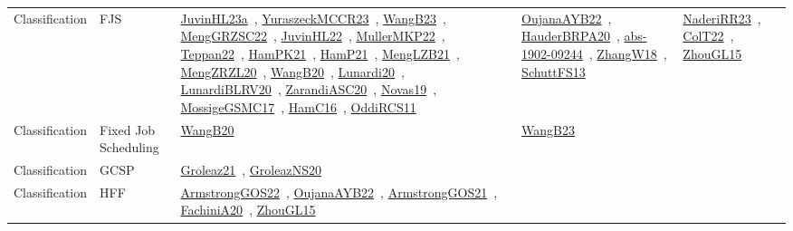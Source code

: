 {\begin{longtable}{lp{3cm}>{\raggedright\arraybackslash}p{6cm}>{\raggedright\arraybackslash}p{6cm}>{\raggedright\arraybackslash}p{8cm}}
\index{FJS}\index{Classification!FJS}Classification & FJS & \href{../works/JuvinHL23a.pdf}{JuvinHL23a}~\cite{JuvinHL23a}, \href{../works/YuraszeckMCCR23.pdf}{YuraszeckMCCR23}~\cite{YuraszeckMCCR23}, \href{../works/WangB23.pdf}{WangB23}~\cite{WangB23}, \href{../works/MengGRZSC22.pdf}{MengGRZSC22}~\cite{MengGRZSC22}, \href{../works/JuvinHL22.pdf}{JuvinHL22}~\cite{JuvinHL22}, \href{../works/MullerMKP22.pdf}{MullerMKP22}~\cite{MullerMKP22}, \href{../works/Teppan22.pdf}{Teppan22}~\cite{Teppan22}, \href{../works/HamPK21.pdf}{HamPK21}~\cite{HamPK21}, \href{../works/HamP21.pdf}{HamP21}~\cite{HamP21}, \href{../works/MengLZB21.pdf}{MengLZB21}~\cite{MengLZB21}, \href{../works/MengZRZL20.pdf}{MengZRZL20}~\cite{MengZRZL20}, \href{../works/WangB20.pdf}{WangB20}~\cite{WangB20}, \href{../works/Lunardi20.pdf}{Lunardi20}~\cite{Lunardi20}, \href{../works/LunardiBLRV20.pdf}{LunardiBLRV20}~\cite{LunardiBLRV20}, \href{../works/ZarandiASC20.pdf}{ZarandiASC20}~\cite{ZarandiASC20}, \href{../works/Novas19.pdf}{Novas19}~\cite{Novas19}, \href{../works/MossigeGSMC17.pdf}{MossigeGSMC17}~\cite{MossigeGSMC17}, \href{../works/HamC16.pdf}{HamC16}~\cite{HamC16}, \href{../works/OddiRCS11.pdf}{OddiRCS11}~\cite{OddiRCS11} & \href{../works/OujanaAYB22.pdf}{OujanaAYB22}~\cite{OujanaAYB22}, \href{../works/HauderBRPA20.pdf}{HauderBRPA20}~\cite{HauderBRPA20}, \href{../works/abs-1902-09244.pdf}{abs-1902-09244}~\cite{abs-1902-09244}, \href{../works/ZhangW18.pdf}{ZhangW18}~\cite{ZhangW18}, \href{../works/SchuttFS13.pdf}{SchuttFS13}~\cite{SchuttFS13} & \href{../works/NaderiRR23.pdf}{NaderiRR23}~\cite{NaderiRR23}, \href{../works/ColT22.pdf}{ColT22}~\cite{ColT22}, \href{../works/ZhouGL15.pdf}{ZhouGL15}~\cite{ZhouGL15}\\
\index{Fixed Job Scheduling}\index{Classification!Fixed Job Scheduling}Classification & Fixed Job Scheduling & \href{../works/WangB20.pdf}{WangB20}~\cite{WangB20} & \href{../works/WangB23.pdf}{WangB23}~\cite{WangB23} & \\
\index{GCSP}\index{Classification!GCSP}Classification & GCSP & \href{../works/Groleaz21.pdf}{Groleaz21}~\cite{Groleaz21}, \href{../works/GroleazNS20.pdf}{GroleazNS20}~\cite{GroleazNS20} &  & \\
\index{HFF}\index{Classification!HFF}Classification & HFF & \href{../works/ArmstrongGOS22.pdf}{ArmstrongGOS22}~\cite{ArmstrongGOS22}, \href{../works/OujanaAYB22.pdf}{OujanaAYB22}~\cite{OujanaAYB22}, \href{../works/ArmstrongGOS21.pdf}{ArmstrongGOS21}~\cite{ArmstrongGOS21}, \href{../works/FachiniA20.pdf}{FachiniA20}~\cite{FachiniA20}, \href{../works/ZhouGL15.pdf}{ZhouGL15}~\cite{ZhouGL15} &  & \\

\end{longtable}}
